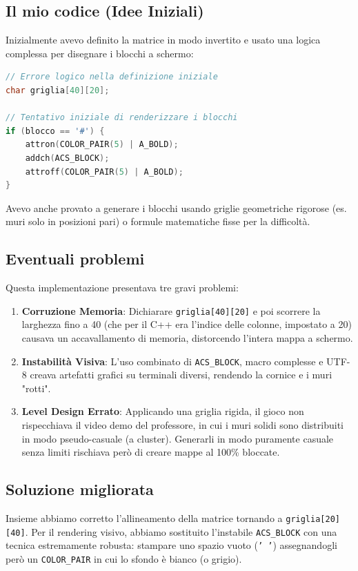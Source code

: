 \documentclass[12pt,a4paper]{article}
\begin{document}
\subsection{Il mio codice (Idee Iniziali)}
Inizialmente avevo definito la matrice in modo invertito e usato una logica complessa per disegnare i blocchi a schermo:
\begin{lstlisting}[language=C++]
// Errore logico nella definizione iniziale
char griglia[40][20]; 

// Tentativo iniziale di renderizzare i blocchi
if (blocco == '#') {
    attron(COLOR_PAIR(5) | A_BOLD);
    addch(ACS_BLOCK);
    attroff(COLOR_PAIR(5) | A_BOLD);
}
\end{lstlisting}
Avevo anche provato a generare i blocchi usando griglie geometriche rigorose (es. muri solo in posizioni pari) o formule matematiche fisse per la difficoltà.

\subsection{Eventuali problemi}
Questa implementazione presentava tre gravi problemi:
\begin{enumerate}
    \item \textbf{Corruzione Memoria}: Dichiarare \texttt{griglia[40][20]} e poi scorrere la larghezza fino a 40 (che per il C++ era l'indice delle colonne, impostato a 20) causava un accavallamento di memoria, distorcendo l'intera mappa a schermo.
    \item \textbf{Instabilità Visiva}: L'uso combinato di \texttt{ACS\_BLOCK}, macro complesse e UTF-8 creava artefatti grafici su terminali diversi, rendendo la cornice e i muri "rotti".
    \item \textbf{Level Design Errato}: Applicando una griglia rigida, il gioco non rispecchiava il video demo del professore, in cui i muri solidi sono distribuiti in modo pseudo-casuale (a cluster). Generarli in modo puramente casuale senza limiti rischiava però di creare mappe al 100\% bloccate.
\end{enumerate}

\subsection{Soluzione migliorata}
Insieme abbiamo corretto l'allineamento della matrice tornando a \texttt{griglia[20][40]}. Per il rendering visivo, abbiamo sostituito l'instabile \texttt{ACS\_BLOCK} con una tecnica estremamente robusta: stampare uno spazio vuoto (\texttt{' '}) assegnandogli però un \texttt{COLOR\_PAIR} in cui lo sfondo è bianco (o grigio).
\end{document}
